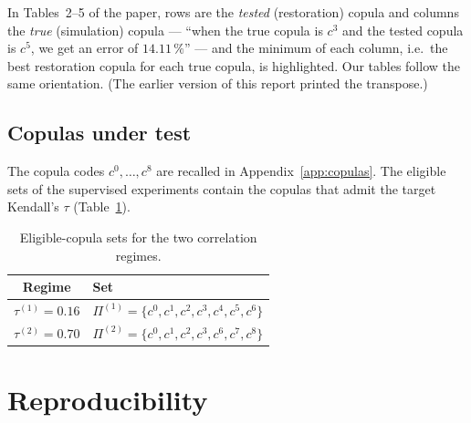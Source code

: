 \documentclass[11pt,a4paper]{article}
\begin{document}
In Tables~2--5 of the paper, rows are the \emph{tested} (restoration) copula
and columns the \emph{true} (simulation) copula --- ``when the true copula is
$c^3$ and the tested copula is $c^5$, we get an error of $14.11\,\%$'' --- and
the minimum of each column, i.e.\ the best restoration copula for each true
copula, is highlighted. Our tables follow the same orientation. (The earlier
version of this report printed the transpose.)

\subsection{Copulas under test}

The copula codes $c^0,\dots,c^8$ are recalled in Appendix~\ref{app:copulas}.
The eligible sets of the supervised experiments contain the copulas that
admit the target Kendall's $\tau$ (Table~\ref{tab:copula-sets}).

\begin{table}[htbp]
  \centering
  \caption{Eligible-copula sets for the two correlation regimes.}
  \label{tab:copula-sets}
  \begin{tabular}{cl}
    \toprule
    Regime & Set\\
    \midrule
    $\tau^{(1)}=0.16$ &
       $\Pi^{(1)} = \{c^{0}, c^{1}, c^{2}, c^{3}, c^{4}, c^{5}, c^{6}\}$ \\
    $\tau^{(2)}=0.70$ &
       $\Pi^{(2)} = \{c^{0}, c^{1}, c^{2}, c^{3}, c^{6}, c^{7}, c^{8}\}$ \\
    \bottomrule
  \end{tabular}
\end{table}

\section{Reproducibility}\label{sec:reproducibility}
\end{document}
